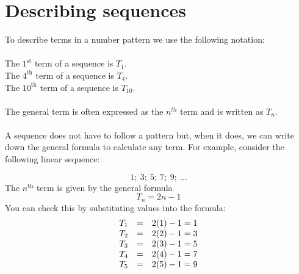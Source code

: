 \section{Describing sequences}


 
To describe terms in a number pattern we use the following notation:\\
\\
The $1^{\mbox{st}}$ term of a sequence is $T_{1}$.\\
The $4^{\mbox{th}}$ term of a sequence is $T_{4}$.\\
The $10^{\mbox{th}}$ term of a sequence is $T_{10}$.\\
\\
The general term is often expressed as the ${n}^{th}$ term and is written as ${T}_{n}$. \\
\\A sequence does not have to follow a pattern but, when it does, we can write down the general formula to calculate any term.
For example, consider the following linear sequence:
     
\begin{equation*}
  1;~3;~5;~7;~9;~\ldots
\end{equation*}
The ${n}^{\mbox{th}}$ term is given by the general formula
\begin{equation*}
  T_n = 2n-1
\end{equation*}
You can check this by substituting values into the formula:
\begin{equation*}
    \begin{array}{ccc}\hfill {T}_{1}& =& 2(1)-1 = 1 \hfill \\ 
    \hfill {T}_{2}& =& 2(2)-1 = 3\hfill \\
    \hfill {T}_{3}& =& 2(3)-1 = 5\hfill \\
    \hfill {T}_{4}& =& 2(4)-1 = 7\hfill \\
    \hfill {T}_{5}& =& 2(5)-1 = 9\hfill \\
\end{array}
\end{equation*}

